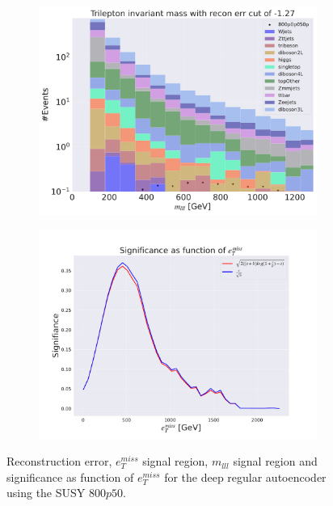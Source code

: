 \begin{figure}[H]
    \hfill
    \begin{subfigure}{.49\textwidth}
        \includegraphics[width=\textwidth]{Figures/AE_testing/big/3lep/b_data_recon_big_rm3_feats_sig_800p0p050p_mlll_recon_errcut_-1.27.pdf}
        \caption{}
        \label{fig:AE_3lep_big_mlll_800}
    \end{subfigure}
    \hfill   
    \begin{subfigure}{.49\textwidth}
        \includegraphics[width=\textwidth]{Figures/AE_testing/big/3lep/significance_etmiss_800p0p050p_-1.2726592563014343.pdf}
        \caption{}
        \label{fig:AE_3lep_big_signi_800}
    \end{subfigure}
    \hfill      
    \caption[3lep deep network | $800p50$ | AE]{Reconstruction error, $e_T^{miss}$ signal region, $m_{lll}$ signal region and significance as function of 
    $e_T^{miss}$ for the deep regular autoencoder using the SUSY $800p50$.}
    \label{fig:AE_3lep_big_rec_sig_signi_800}
\end{figure}

